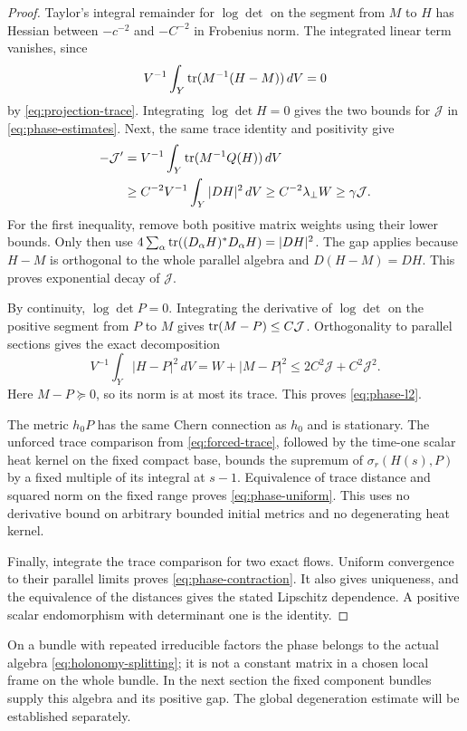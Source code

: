 \begin{proof}
Taylor's integral remainder for $\log\det$ on the segment from $M$
to $H$ has Hessian between $-c^{-2}$ and $-C^{-2}$ in Frobenius norm.
The integrated linear term vanishes, since
\[
 V^{-1}\int_Y\operatorname{tr}(M^{-1}(H-M))\,dV=0
\]
by \eqref{eq:projection-trace}. Integrating $\log\det H=0$ gives
the two bounds for $\mathcal J$ in \eqref{eq:phase-estimates}.
Next, the same trace identity and positivity give
\begin{align*}
 -\mathcal J'&=V^{-1}\int_Y\operatorname{tr}(M^{-1}Q(H))\,dV\\
     &\ge C^{-2}V^{-1}\int_Y|DH|^2\,dV
      \ge C^{-2}\lambda_\perp W\ge\gamma \mathcal J.
\end{align*}
For the first inequality, remove both positive matrix weights using
their lower bounds. Only then use
$4\sum_\alpha\operatorname{tr}((D_\alpha H)^*D_\alpha H)=|DH|^2$.
The gap applies because $H-M$ is orthogonal to the whole parallel
algebra and $D(H-M)=DH$. This proves exponential decay of $\mathcal J$.

By continuity, $\log\det P=0$. Integrating the derivative of
$\log\det$ on the positive segment from $P$ to $M$ gives
$\operatorname{tr}(M-P)\le C\mathcal J$. Orthogonality to parallel sections gives the exact
decomposition
\[
 V^{-1}\int_Y|H-P|^2\,dV=W+|M-P|^2
       \le 2C^2\mathcal J+C^2\mathcal J^2.
\]
Here $M-P\succeq0$, so its norm is at most its trace. This proves
\eqref{eq:phase-l2}.

The metric $h_0P$ has the same Chern connection as $h_0$ and is
stationary. The unforced trace comparison from
\eqref{eq:forced-trace}, followed by the time-one scalar heat kernel
on the fixed compact base, bounds the supremum of
$\sigma_r(H(s),P)$ by a fixed multiple of its integral at $s-1$.
Equivalence of trace distance and squared norm on the fixed range
proves \eqref{eq:phase-uniform}. This uses no derivative bound on
arbitrary bounded initial metrics and no degenerating heat kernel.

Finally, integrate the trace comparison for two exact flows. Uniform
convergence to their parallel limits proves \eqref{eq:phase-contraction}.
It also gives uniqueness, and the equivalence of the distances gives
the stated Lipschitz dependence. A positive scalar endomorphism with
determinant one is the identity.
\end{proof}

On a bundle with repeated irreducible factors the phase belongs to the
actual algebra \eqref{eq:holonomy-splitting}; it is not a constant matrix
in a chosen local frame on the whole bundle. In the next section the
fixed component bundles supply this algebra and its positive gap.
The global degeneration estimate will be established separately.
